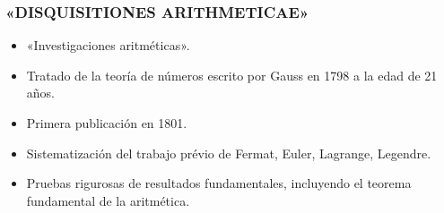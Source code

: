 \begin{frame}
  \frametitle{«DISQUISITIONES ARITHMETICAE»}


  \begin{minipage}[t][0.6\textheight]{0.6\textwidth}
    \vspace{0pt}
    \begin{itemize}
    \item<2-> «Investigaciones aritméticas».

    \item<3-> Tratado de la teoría de números escrito por Gauss en 1798
      a la edad de 21 años.

    \item<4-> Primera publicación en 1801.

    \item<5-> Sistematización del trabajo prévio de
      Fermat, Euler, Lagrange, Legendre.

    \item<6-> Pruebas rigurosas de resultados fundamentales, incluyendo
      el teorema fundamental de la aritmética.


\end{itemize}
\end{minipage}
\end{frame}
